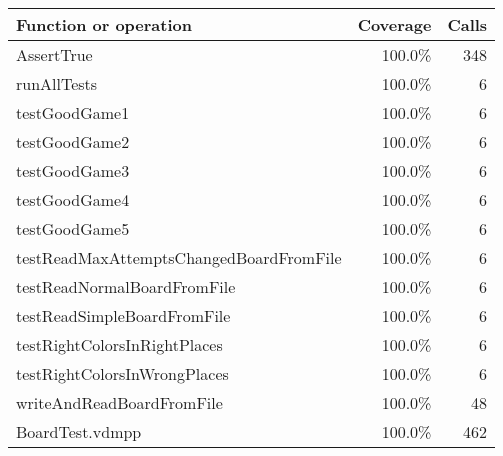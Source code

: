 \bigskip
\begin{longtable}{|l|r|r|}
\hline
Function or operation & Coverage & Calls \\
\hline
\hline
AssertTrue & 100.0\% & 348 \\
\hline
runAllTests & 100.0\% & 6 \\
\hline
testGoodGame1 & 100.0\% & 6 \\
\hline
testGoodGame2 & 100.0\% & 6 \\
\hline
testGoodGame3 & 100.0\% & 6 \\
\hline
testGoodGame4 & 100.0\% & 6 \\
\hline
testGoodGame5 & 100.0\% & 6 \\
\hline
testReadMaxAttemptsChangedBoardFromFile & 100.0\% & 6 \\
\hline
testReadNormalBoardFromFile & 100.0\% & 6 \\
\hline
testReadSimpleBoardFromFile & 100.0\% & 6 \\
\hline
testRightColorsInRightPlaces & 100.0\% & 6 \\
\hline
testRightColorsInWrongPlaces & 100.0\% & 6 \\
\hline
writeAndReadBoardFromFile & 100.0\% & 48 \\
\hline
\hline
BoardTest.vdmpp & 100.0\% & 462 \\
\hline
\end{longtable}

